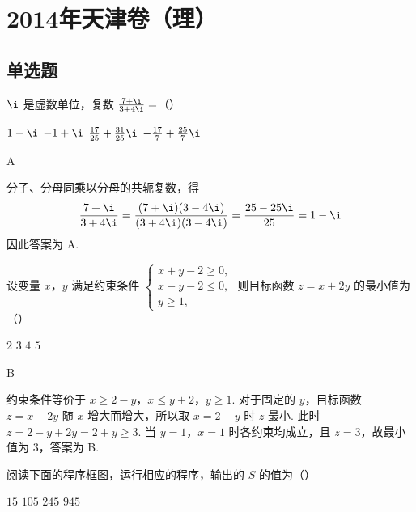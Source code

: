 \chapter{2014年天津卷（理）}

\section{单选题}

\begin{problem}
\(\i\) 是虚数单位，复数 \(\frac{7 + \i}{3 + 4\i} =\)（\quad）

\choices
    {\(1 - \i\)}
    {\(-1 + \i\)}
    {\(\frac{17}{25} + \frac{31}{25}\i\)}
    {\(-\frac{17}{7} + \frac{25}{7}\i\)}
\end{problem}

\begin{answer}
A
\end{answer}

\begin{solution}
分子、分母同乘以分母的共轭复数，得
\[
\frac{7+\i}{3+4\i}=\frac{(7+\i)(3-4\i)}{(3+4\i)(3-4\i)}=\frac{25-25\i}{25}=1-\i
\]
因此答案为 A.
\end{solution}

\begin{problem}
设变量 \(x\)，\(y\) 满足约束条件 \(\begin{cases}
x + y - 2 \geqslant 0,\\
x - y - 2 \leqslant 0,\\
y \geqslant 1,
\end{cases}\) 则目标函数 \(z = x + 2y\) 的最小值为（\quad）

\choices
    {\(2\)}
    {\(3\)}
    {\(4\)}
    {\(5\)}
\end{problem}

\begin{answer}
B
\end{answer}

\begin{solution}
约束条件等价于 \(x\geqslant2-y\)，\(x\leqslant y+2\)，\(y\geqslant1\). 对于固定的 \(y\)，目标函数 \(z=x+2y\) 随 \(x\) 增大而增大，所以取 \(x=2-y\) 时 \(z\) 最小. 此时 \(z=2-y+2y=2+y\geqslant3\). 当 \(y=1\)，\(x=1\) 时各约束均成立，且 \(z=3\)，故最小值为 \(3\)，答案为 B.
\end{solution}

\begin{problem}
阅读下面的程序框图，运行相应的程序，输出的 \(S\) 的值为（\quad）


\choices
    {\(15\)}
    {\(105\)}
    {\(245\)}
    {\(945\)}
\end{problem}

